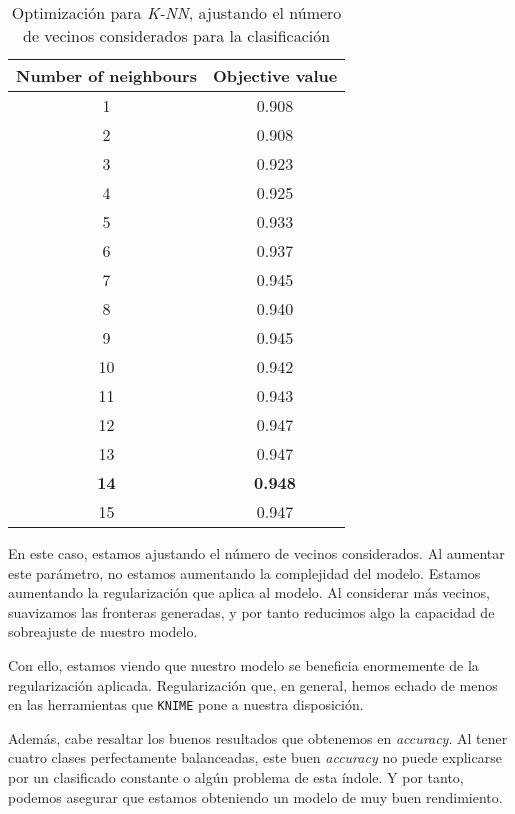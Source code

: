 \documentclass[11pt]{article}
\begin{document}
\begin{table}[H]
\begin{center}
    \begin{tabular}{|c|c|}
        \hline
        Number of neighbours & Objective value \\
        \hline
        1 & 0.908 \\
        2 & 0.908 \\
        3 & 0.923 \\
        4 & 0.925 \\
        5 & 0.933 \\
        6 & 0.937 \\
        7 & 0.945 \\
        8 & 0.940 \\
        9 & 0.945 \\
        10 & 0.942 \\
        11 & 0.943 \\
        12 & 0.947 \\
        13 & 0.947 \\
        \textbf{14} & \textbf{0.948} \\
        15 & 0.947 \\
        \hline
    \end{tabular}
\end{center}
    \caption{Optimización para \emph{K-NN}, ajustando el número de vecinos considerados para la clasificación}
    \label{dataset02_optim_knn:tabla}
\end{table}

En este caso, estamos ajustando el número de vecinos considerados. Al aumentar este parámetro, no estamos aumentando la complejidad del modelo. Estamos aumentando la regularización que aplica al modelo. Al considerar más vecinos, suavizamos las fronteras generadas, y por tanto reducimos algo la capacidad de sobreajuste de nuestro modelo.

Con ello, estamos viendo que nuestro modelo se beneficia enormemente de la regularización aplicada. Regularización que, en general, hemos echado de menos en las herramientas que \lstinline{KNIME} pone a nuestra disposición.

Además, cabe resaltar los buenos resultados que obtenemos en \emph{accuracy}. Al tener cuatro clases perfectamente balanceadas, este buen \emph{accuracy} no puede explicarse por un clasificado constante o algún problema de esta índole. Y por tanto, podemos asegurar que estamos obteniendo un modelo de muy buen rendimiento.
\end{document}

